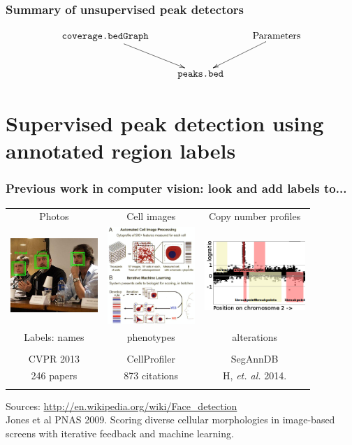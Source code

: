 \documentclass{beamer}
\begin{document}
\begin{frame}
  \frametitle{Summary of unsupervised peak detectors}
  \begin{displaymath}
  \xymatrix{
    \texttt{coverage.bedGraph}
    \ar [dr] 
    & \text{ }
    & \text{Parameters} 
    \ar [dl]
    \\
    & \texttt{peaks.bed}
  }
  \end{displaymath}
  
\end{frame}

\section{Supervised peak detection using annotated region labels}

\begin{frame}
  \frametitle{Previous work in computer vision: look and add labels
    to...}
  \begin{tabular}{ccc}
    Photos & Cell images & Copy number profiles \\
    \includegraphics[width=1.3in]{faces} &
    \includegraphics[width=1.3in]{cellprofiler} &
    \includegraphics[width=1.5in]{regions-axes}\\
    Labels: names & phenotypes & alterations \\ \\
    CVPR 2013 & CellProfiler & SegAnnDB \\
    246 papers & 873 citations & H, \emph{et. al.} 2014. \\
     &
  \end{tabular}
  Sources: \url{http://en.wikipedia.org/wiki/Face_detection}\\
  Jones et al PNAS 2009. Scoring diverse cellular morphologies in
  image-based screens with iterative feedback and machine learning.
\end{frame}
\end{document}
